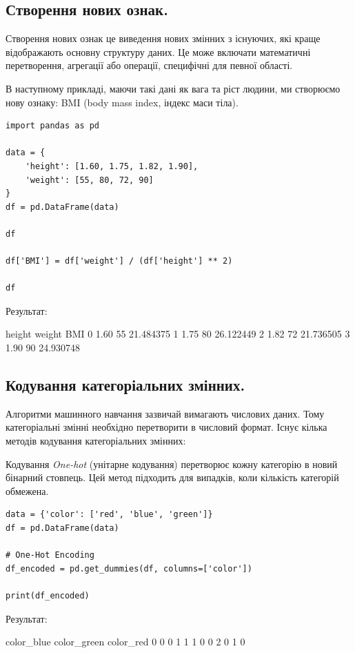 \subsection{Створення нових ознак.}

Створення нових ознак це виведення нових змінних з існуючих, які краще відображають основну структуру даних. 
Це може включати математичні перетворення, агрегації або операції, специфічні для певної області.

В наступному прикладі, маючи такі дані як вага та ріст людини, ми створюємо нову ознаку: 
BMI (body mass index, індекс маси тіла).

\begin{lstlisting}
import pandas as pd

data = {
    'height': [1.60, 1.75, 1.82, 1.90],
    'weight': [55, 80, 72, 90]
}
df = pd.DataFrame(data)

df

df['BMI'] = df['weight'] / (df['height'] ** 2)

df
\end{lstlisting}

Результат:

\begin{console}
	height	weight	BMI
0	1.60	55	21.484375
1	1.75	80	26.122449
2	1.82	72	21.736505
3	1.90	90	24.930748
\end{console}


\subsection{Кодування категоріальних змінних.}

Алгоритми машинного навчання зазвичай вимагають числових даних. Тому категоріальні змінні необхідно 
перетворити в числовий формат. Існує кілька методів кодування категоріальних змінних:

Кодування \textit{One-hot} (унітарне кодування) перетворює кожну категорію в новий бінарний стовпець. 
Цей метод підходить для 
випадків, коли кількість категорій обмежена.


\begin{lstlisting}
data = {'color': ['red', 'blue', 'green']}
df = pd.DataFrame(data)

# One-Hot Encoding
df_encoded = pd.get_dummies(df, columns=['color'])

print(df_encoded)
\end{lstlisting}

Результат:

\begin{console}
   color_blue  color_green  color_red
0           0            0          1
1           1            0          0
2           0            1          0
\end{console}

